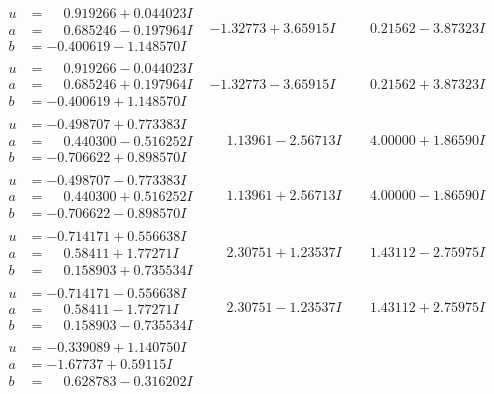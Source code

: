 \documentclass[1p]{elsarticle_modified}
\theoremstyle{definition}
\begin{document}
$$\begin{array}{c|c|c}
\begin{aligned}
u &= \phantom{-}0.919266 + 0.044023 I \\
a &= \phantom{-}0.685246 - 0.197964 I \\
b &= -0.400619 - 1.148570 I\end{aligned}
 & -1.32773 + 3.65915 I & \phantom{-}0.21562 - 3.87323 I \\ \hline\begin{aligned}
u &= \phantom{-}0.919266 - 0.044023 I \\
a &= \phantom{-}0.685246 + 0.197964 I \\
b &= -0.400619 + 1.148570 I\end{aligned}
 & -1.32773 - 3.65915 I & \phantom{-}0.21562 + 3.87323 I \\ \hline\begin{aligned}
u &= -0.498707 + 0.773383 I \\
a &= \phantom{-}0.440300 - 0.516252 I \\
b &= -0.706622 + 0.898570 I\end{aligned}
 & \phantom{-}1.13961 - 2.56713 I & \phantom{-}4.00000 + 1.86590 I \\ \hline\begin{aligned}
u &= -0.498707 - 0.773383 I \\
a &= \phantom{-}0.440300 + 0.516252 I \\
b &= -0.706622 - 0.898570 I\end{aligned}
 & \phantom{-}1.13961 + 2.56713 I & \phantom{-}4.00000 - 1.86590 I \\ \hline\begin{aligned}
u &= -0.714171 + 0.556638 I \\
a &= \phantom{-}0.58411 + 1.77271 I \\
b &= \phantom{-}0.158903 + 0.735534 I\end{aligned}
 & \phantom{-}2.30751 + 1.23537 I & \phantom{-}1.43112 - 2.75975 I \\ \hline\begin{aligned}
u &= -0.714171 - 0.556638 I \\
a &= \phantom{-}0.58411 - 1.77271 I \\
b &= \phantom{-}0.158903 - 0.735534 I\end{aligned}
 & \phantom{-}2.30751 - 1.23537 I & \phantom{-}1.43112 + 2.75975 I \\ \hline\begin{aligned}
u &= -0.339089 + 1.140750 I \\
a &= -1.67737 + 0.59115 I \\
b &= \phantom{-}0.628783 - 0.316202 I\end{aligned}

\end{array}$$
\end{document}
